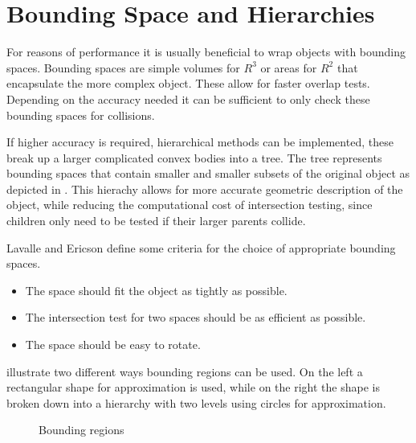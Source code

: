 \section{Bounding Space and Hierarchies}
For reasons of performance it is usually beneficial to wrap objects with bounding spaces. Bounding spaces are simple volumes for $R^3$ or areas for $R^2$ that encapsulate the more complex object. These allow for faster overlap tests. Depending on the accuracy needed it can be sufficient to only check these bounding spaces for collisions. \cite{LaValle.2006,Ericson.2005}

If higher accuracy is required, hierarchical methods can be implemented, these break up a larger complicated convex bodies into a tree. The tree represents bounding spaces that contain smaller and smaller subsets of the original object as depicted in . This hierachy allows for more accurate geometric description of the object, while reducing the computational cost of intersection testing, since children only need to be tested if their larger parents collide. \cite{LaValle.2006,Ericson.2005}

Lavalle and Ericson define some criteria for the choice of appropriate bounding spaces.

\begin{itemize}
	\item The space should fit the object as tightly as possible.
	\item The intersection test for two spaces should be as efficient as possible.
	\item The space should be easy to rotate.
\end{itemize}

 illustrate two different ways bounding regions can be used. On the left a rectangular shape for approximation is used, while on the right the shape is broken down into a hierarchy with two levels using circles for approximation.

\begin{figure}[h]
    \caption{Bounding regions}
    \label{fig:boundingRegions}
\end{figure}


